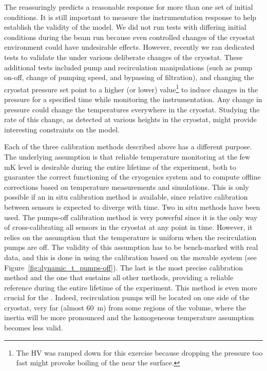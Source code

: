 The  reassuringly predicts a reasonable response for more than one set of initial conditions. It is still important to %
measure the 
instrumentation response to help establish the validity of the  model. We did not run tests with differing initial conditions during the beam run because even controlled changes of the cryostat environment could have undesirable effects. However, recently we ran dedicated tests to validate the  under various deliberate changes of the cryostat. %
These  additional tests included pump and recirculation manipulations (such as pump on-off, change of pumping speed, and bypassing of filtration), and changing the cryostat pressure set point to a higher (or lower) value\footnote{The HV 
was ramped down for this exercise because dropping the pressure too fast might provoke boiling of the  near the surface.} to induce changes in the pressure for a specified time while monitoring the instrumentation. Any change in pressure could change the temperatures everywhere in the cryostat. Studying the rate of this change, as detected at various heights in the cryostat, might provide interesting constraints on the  model.


Each of the three calibration methods described above has a different purpose. 
The underlying assumption is that reliable temperature monitoring at the few \si{mK} level is desirable during the entire lifetime of the experiment, both to guarantee the correct functioning of the cryogenics system and to compute offline corrections based on temperature measurements and  simulations. This is only possible if an in situ calibration method is available, since relative calibration between sensors is expected to diverge with time. %
Two in situ methods have been used. The pumps-off calibration method is very powerful since it is the only way of cross-calibrating all sensors in the cryostat at any point in time. However, it relies on the assumption that the temperature is uniform when the recirculation pumps are off. The validity of this assumption has to be bench-marked with real data, and this is done in  using the calibration based on the movable system (see Figure~\ref{fig:dynamic_t_pumps-off}). The last 
is the most precise calibration method and the one that sustains all other methods, providing a reliable reference during the entire lifetime of the experiment. This method is even more crucial for the . Indeed, recirculation pumps will be located on one side of the cryostat, very far (almost \SI{60}{m}) from some regions of the  volume, where the inertia will be more pronounced and the homogeneous temperature assumption becomes less valid.   

